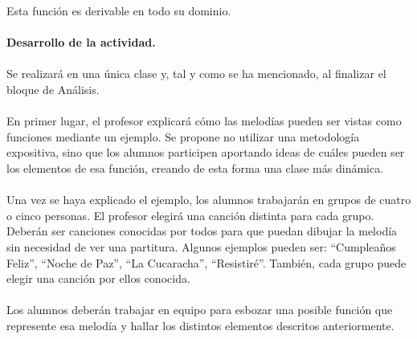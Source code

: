 \documentclass[a4paper, openright, 11pt, titlepage]{report}
\theoremstyle{definition}\newtheorem{defin}[propo]{Definition}
\theoremstyle{definition}\newtheorem{obser}[propo]{Remark}
\theoremstyle{definition}\newtheorem{ejem}[propo]{Ejemplo}
\theoremstyle{definition}\newtheorem{algoritmo}[propo]{Algoritmo}
\begin{document}
Esta función es derivable en todo su dominio. \\\\
\textbf{Desarrollo de la actividad.}\\\\
Se realizará en una única clase y, tal y como se ha mencionado, al finalizar el bloque de Análisis.\\\\
En primer lugar, el profesor explicará cómo las melodías pueden ser vistas como funciones mediante un ejemplo. Se propone no utilizar una metodología expositiva, sino que los alumnos participen aportando ideas de cuáles pueden ser los elementos de esa función, creando de esta forma una clase más dinámica.\\\\
Una vez se haya explicado el ejemplo, los alumnos trabajarán en grupos de cuatro o cinco personas. El profesor elegirá una canción distinta para cada grupo. Deberán ser canciones conocidas por todos para que puedan dibujar la melodía sin necesidad de ver una partitura. Algunos ejemplos pueden ser: ``Cumpleaños Feliz'', ``Noche de Paz'', ``La Cucaracha'', ``Resistiré''. También, cada grupo puede elegir una canción por ellos conocida.\\\\
Los alumnos deberán trabajar en equipo para esbozar una posible función que represente esa melodía y hallar los distintos elementos descritos anteriormente. 
\end{document}

